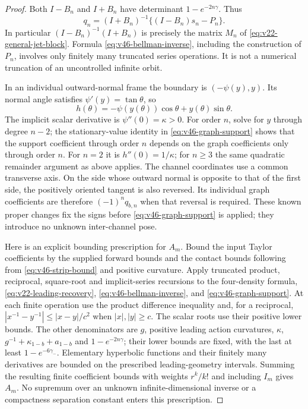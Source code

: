 \begin{proof}
Both $I-B_n$ and $I+B_n$ have determinant $1-e^{-2n\gamma}$.
Thus
\begin{equation}\label{eq:v46-bellman-inverse}
 q_n=(I+B_n)^{-1}\{(I-B_n)s_n-P_n\}.
\end{equation}
In particular $(I-B_n)^{-1}(I+B_n)$ is precisely the matrix
$M_n$ of \eqref{eq:v22-general-jet-block}.  Formula
\eqref{eq:v46-bellman-inverse}, including the construction of $P_n$,
involves only finitely many truncated series operations.  It is not a
numerical truncation of an uncontrolled infinite orbit.

In an individual outward-normal frame the boundary is
$(-\psi(y),y)$.  Its normal angle satisfies $\psi'(y)=\tan\theta$, so
\begin{equation}\label{eq:v46-graph-support}
 h(\theta)=-\psi(y(\theta))\cos\theta+y(\theta)\sin\theta.
\end{equation}
The implicit scalar derivative is $\psi''(0)=\kappa>0$.
For order $n$, solve for $y$ through degree $n-2$; the stationary-value
identity in \eqref{eq:v46-graph-support} shows that the support coefficient
through order $n$ depends on the graph coefficients only through order $n$.
For $n=2$ it is $h''(0)=1/\kappa$; for $n\ge3$ the same quadratic
remainder argument as above applies.  The channel coordinates use a common transverse axis.  On the side whose
outward normal is opposite to that of the first side, the positively oriented
tangent is also reversed.  Its individual graph coefficients are therefore
$(-1)^nq_{b,n}$ when that reversal is required.  These known proper changes
fix the signs before \eqref{eq:v46-graph-support} is applied; they introduce
no unknown inter-channel pose.

Here is an explicit bounding prescription for $A_m$.  Bound the input
Taylor coefficients by the supplied forward bounds and the contact bounds
following from \eqref{eq:v46-strip-bound} and positive curvature.  Apply
truncated product, reciprocal, square-root and implicit-series recursions
to the four-density formula, \eqref{eq:v22-leading-recovery},
\eqref{eq:v46-bellman-inverse}, and \eqref{eq:v46-graph-support}.
At each finite operation use the product difference inequality and, for a
reciprocal, $|x^{-1}-y^{-1}|\le |x-y|/c^2$ when $|x|,|y|\ge c$.
The scalar roots use their positive lower bounds.  The other denominators
are $g$, positive leading action curvatures, $\kappa$,
$g^{-1}+\kappa_{1-b}+a_{1-b}$ and $1-e^{-2n\gamma}$; their lower bounds
are fixed, with the last at least $1-e^{-6\gamma_-}$.
Elementary hyperbolic functions and their finitely many derivatives are
bounded on the prescribed leading-geometry intervals.  Summing the
resulting finite coefficient bounds with weights $r^k/k!$ and including
$I_m$ gives $A_m$.  No supremum over an unknown infinite-dimensional
inverse or a compactness separation constant enters this prescription.
\end{proof}

